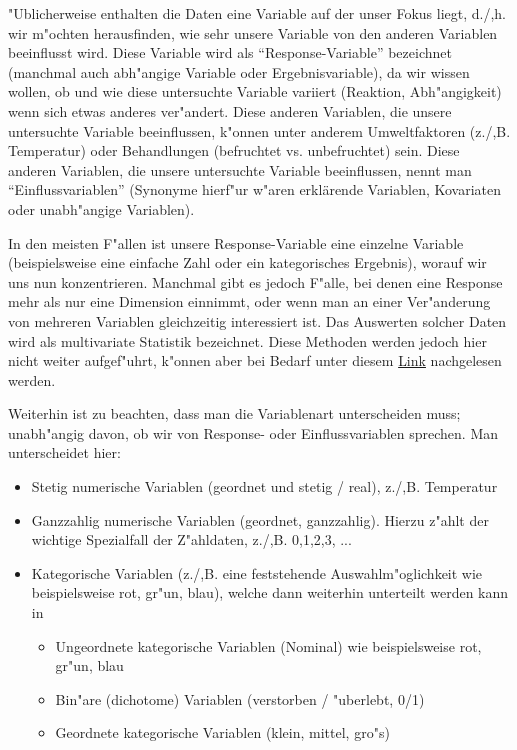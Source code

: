 \documentclass[a4paper,twoside]{tufte-book}\usepackage[]{graphicx}\usepackage[]{color}
\begin{document}
{"Ublicherweise enthalten die Daten eine Variable auf der unser Fokus liegt, d./,h. wir m"ochten herausfinden, wie sehr unsere Variable von den anderen Variablen beeinflusst wird.   Diese Variable wird als ``Response-Variable'' bezeichnet (manchmal auch abh"angige Variable oder Ergebnisvariable), da wir wissen wollen, ob und wie diese untersuchte Variable variiert (Reaktion, Abh"angigkeit) wenn sich etwas anderes ver"andert. Diese anderen Variablen, die unsere untersuchte Variable beeinflussen, k"onnen unter anderem Umweltfaktoren (z./,B. Temperatur) oder Behandlungen (befruchtet vs. unbefruchtet) sein.  Diese anderen Variablen, die unsere untersuchte Variable beeinflussen, nennt man ``Einflussvariablen'' (Synonyme hierf"ur w"aren erklärende Variablen, Kovariaten oder unabh"angige Variablen). 

In den  meisten F"allen ist unsere Response-Variable eine einzelne Variable (beispielsweise eine einfache Zahl oder ein kategorisches Ergebnis), worauf wir uns nun konzentrieren. Manchmal gibt es jedoch F"alle, bei denen eine Response mehr als nur eine Dimension einnimmt, oder wenn man an einer Ver"anderung von mehreren Variablen gleichzeitig interessiert ist. Das Auswerten solcher Daten wird als multivariate Statistik bezeichnet. Diese Methoden werden jedoch hier nicht weiter aufgef"uhrt, k"onnen aber bei Bedarf unter diesem \href{http://biometry.github.io/APES/Stats/stats50-MultivariateStatistics.html}{Link} nachgelesen werden.

Weiterhin ist zu beachten, dass man die Variablenart unterscheiden muss; unabh"angig davon, ob wir von Response- oder Einflussvariablen sprechen. Man unterscheidet hier: 

\begin{itemize}
\item Stetig numerische Variablen (geordnet und stetig / real), z./,B. Temperatur
\item Ganzzahlig numerische Variablen (geordnet, ganzzahlig). Hierzu z"ahlt der wichtige Spezialfall der Z"ahldaten, z./,B. 0,1,2,3, ...
\item Kategorische Variablen (z./,B. eine feststehende Auswahlm"oglichkeit wie beispielsweise rot, gr"un, blau), welche dann weiterhin unterteilt werden kann in 
\begin{itemize}
\item Ungeordnete kategorische Variablen (Nominal) wie beispielsweise rot, gr"un, blau
\item Bin"are (dichotome) Variablen (verstorben / "uberlebt, 0/1)
\item Geordnete kategorische Variablen (klein, mittel, gro"s)
\end{itemize}
\end{itemize}

}
\end{document}
